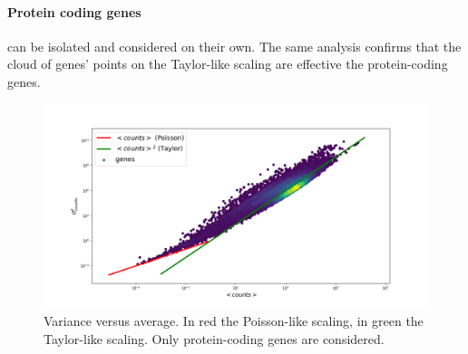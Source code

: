 \paragraph{Protein coding genes} can be isolated and considered on their own. The same analysis confirms that the cloud of genes' points on the Taylor-like scaling are effective the protein-coding genes.
\begin{figure}[htb!]
    \centering
    \includegraphics[width=0.9\linewidth]{pictures/scalinglaws/gtex/varmean_loglog_density.png}
    \caption{Variance versus average. In \textcolor{pythonred}{red} the Poisson-like scaling, in \textcolor{pythongreen}{green} the Taylor-like scaling. Only protein-coding genes are considered.}
    \label{fig:scalinglaws/gtex/varmean_loglog_density}
\end{figure}

